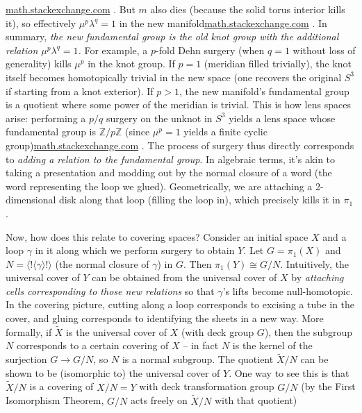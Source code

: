 \documentclass[11pt]{article}
\theoremstyle{remark}
\begin{document}
\href{https://math.stackexchange.com/questions/2477228/fundamental-group-of-3-manifold-obtained-by-surgery-description#:~:text=The%20fundamental%20group%20of%20the,to%20the%20following%20additional%20relations}{math.stackexchange.com}
. But $m$ also dies (because the solid torus interior kills it), so effectively $\mu^p \lambda^q = 1$ in the new manifold\href{https://math.stackexchange.com/questions/2477228/fundamental-group-of-3-manifold-obtained-by-surgery-description#:~:text=The%20fundamental%20group%20of%20the,to%20the%20following%20additional%20relations}{math.stackexchange.com}
. In summary, \textit{the new fundamental group is the old knot group with the additional relation $\mu^p \lambda^q = 1$.} For example, a $p$-fold Dehn surgery (when $q=1$ without loss of generality) kills $\mu^p$ in the knot group. If $p=1$ (meridian filled trivially), the knot itself becomes homotopically trivial in the new space (one recovers the original $S^3$ if starting from a knot exterior). If $p>1$, the new manifold’s fundamental group is a quotient where some power of the meridian is trivial. This is how lens spaces arise: performing a $p/q$ surgery on the unknot in $S^3$ yields a lens space whose fundamental group is $\mathbb{Z}/p\mathbb{Z}$ (since $\mu^p=1$ yields a finite cyclic group)\href{https://math.stackexchange.com/questions/2477228/fundamental-group-of-3-manifold-obtained-by-surgery-description#:~:text=The%20second%20relation%20says%20that,is%20almost%20what%20you%20said}{math.stackexchange.com}
. The process of surgery thus directly corresponds to \textit{adding a relation to the fundamental group}. In algebraic terms, it’s akin to taking a presentation and modding out by the normal closure of a word (the word representing the loop we glued). Geometrically, we are attaching a 2-dimensional disk along that loop (filling the loop in), which precisely kills it in $\pi_1$.

Now, how does this relate to covering spaces? Consider an initial space $X$ and a loop $\gamma$ in it along which we perform surgery to obtain $Y$. Let $G = \pi_1(X)$ and $N = \langle!\langle \gamma \rangle!\rangle$ (the normal closure of $\gamma$) in $G$. Then $\pi_1(Y) \cong G/N$. Intuitively, the universal cover of $Y$ can be obtained from the universal cover of $X$ by \textit{attaching cells corresponding to those new relations} so that $\gamma$’s lifts become null-homotopic. In the covering picture, cutting along a loop corresponds to excising a tube in the cover, and gluing corresponds to identifying the sheets in a new way. More formally, if $\widetilde{X}$ is the universal cover of $X$ (with deck group $G$), then the subgroup $N$ corresponds to a certain covering of $X$ – in fact $N$ is the kernel of the surjection $G \to G/N$, so $N$ is a normal subgroup. The quotient $\widetilde{X}/N$ can be shown to be (isomorphic to) the universal cover of $Y$. One way to see this is that $\widetilde{X}/N$ is a covering of $X/N = Y$ with deck transformation group $G/N$ (by the First Isomorphism Theorem, $G/N$ acts freely on $\widetilde{X}/N$ with that quotient)
\end{document}

